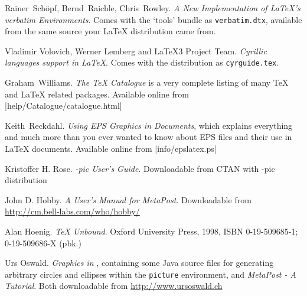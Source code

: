 \begin{thebibliography}{99}
 Rainer~Sch\"opf, Bernd~Raichle, Chris~Rowley.  
\newblock \emph{A New Implementation of \LaTeX's verbatim
  Environments}.
 \newblock Comes with the `tools' bundle as
  \texttt{verbatim.dtx}, available from the same source your \LaTeX{}
  distribution came from. 

 Vladimir Volovich, Werner Lemberg and \LaTeX3 Project Team.                    
    \newblock \emph{Cyrillic languages support in \LaTeX}.                                        
    \newblock Comes with the \LaTeXe{} distribution as                                            
  \texttt{cyrguide.tex}.                                                                          

 Graham~Williams.  \newblock \emph{The TeX
    Catalogue} is a very complete listing of many \TeX{} and \LaTeX{}
    related packages.
  \newblock Available online from \CTAN|help/Catalogue/catalogue.html|
  
 Keith~Reckdahl.  \newblock \emph{Using EPS Graphics in
    \LaTeXe{} Documents}, which explains everything and much more than
  you ever wanted to know about EPS files and their use in \LaTeX{}
  documents.  \newblock Available online from
  \CTAN|info/epslatex.ps|

 Kristoffer H. Rose.
  \newblock \emph{\Xy-pic User's Guide}.  \newblock
  Downloadable from CTAN with \Xy-pic distribution 
  
 John D. Hobby.
  \newblock \emph{A User's Manual for MetaPost}. \newblock
  Downloadable from \url{http://cm.bell-labs.com/who/hobby/} 
  
 Alan Hoenig.
  \newblock \emph{\TeX{} Unbound}. \newblock Oxford University Press, 1998,
    ISBN 0-19-509685-1; 0-19-509686-X (pbk.) 
  
 Urs Oswald.  
    \newblock \emph{Graphics in \LaTeXe{}}, containing some Java source files for 
    generating arbitrary circles and ellipses within the \texttt{picture} environment,
    and \emph{MetaPost - A Tutorial}.
  \newblock Both downloadable from \url{http://www.ursoswald.ch}
  
  

\end{thebibliography}


%

